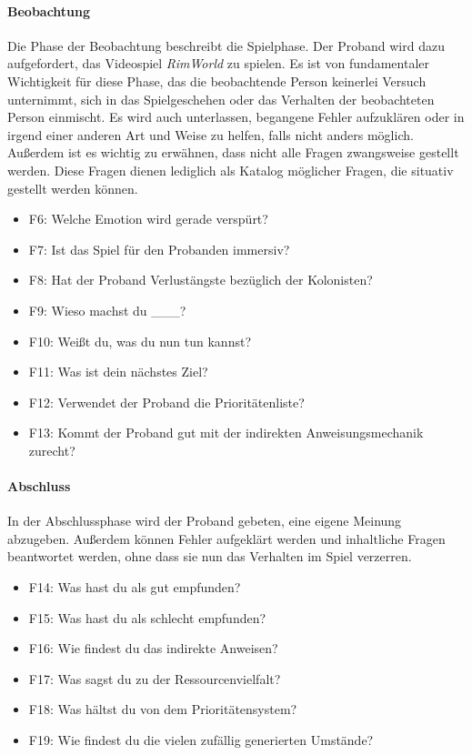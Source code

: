 \paragraph{Beobachtung}
Die Phase der Beobachtung beschreibt die Spielphase. Der Proband wird dazu aufgefordert, das Videospiel \textit{RimWorld} zu spielen. Es ist von fundamentaler Wichtigkeit für diese Phase, das die beobachtende Person keinerlei Versuch unternimmt, sich in das Spielgeschehen oder das Verhalten der beobachteten Person einmischt. Es wird auch unterlassen, begangene Fehler aufzuklären oder in irgend einer anderen Art und Weise zu helfen, falls nicht anders möglich. Außerdem ist es wichtig zu erwähnen, dass nicht alle Fragen zwangsweise gestellt werden. Diese Fragen dienen lediglich als Katalog möglicher Fragen, die situativ gestellt werden können.

\begin{itemize}
    \item F6: Welche Emotion wird gerade verspürt?
    \item F7: Ist das Spiel für den Probanden immersiv?
    \item F8: Hat der Proband Verlustängste bezüglich der Kolonisten?
    \item F9: Wieso machst du \_\_\_?
    \item F10: Weißt du, was du nun tun kannst?
    \item F11: Was ist dein nächstes Ziel?
    \item F12: Verwendet der Proband die Prioritätenliste?
    \item F13: Kommt der Proband gut mit der indirekten Anweisungsmechanik zurecht?
\end{itemize}

\paragraph{Abschluss}
In der Abschlussphase wird der Proband gebeten, eine eigene Meinung abzugeben. Außerdem können Fehler aufgeklärt werden und inhaltliche Fragen beantwortet werden, ohne dass sie nun das Verhalten im Spiel verzerren.

\begin{itemize}
    \item F14: Was hast du als gut empfunden?
    \item F15: Was hast du als schlecht empfunden?
    \item F16: Wie findest du das indirekte Anweisen?
    \item F17: Was sagst du zu der Ressourcenvielfalt?
    \item F18: Was hältst du von dem Prioritätensystem?
    \item F19: Wie findest du die vielen zufällig generierten Umstände?
\end{itemize}

